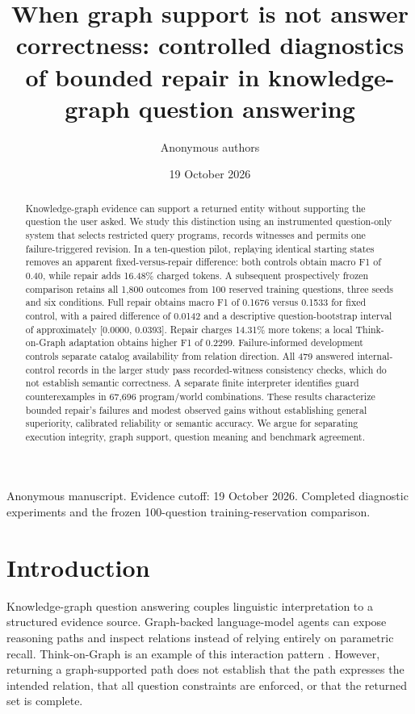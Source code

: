 \documentclass[10pt]{article}
\title{When graph support is not answer correctness: controlled diagnostics of bounded repair in knowledge-graph question answering}
\author{Anonymous authors}
\date{19 October 2026}
\begin{document}
\maketitle

Anonymous manuscript. Evidence cutoff: 19 October 2026. Completed diagnostic experiments and the frozen 100-question training-reservation comparison.\par

\begin{abstract}

Knowledge-graph evidence can support a returned entity without supporting the question the user asked. We study this distinction using an instrumented question-only system that selects restricted query programs, records witnesses and permits one failure-triggered revision. In a ten-question pilot, replaying identical starting states removes an apparent fixed-versus-repair difference: both controls obtain macro F1 of 0.40, while repair adds 16.48\% charged tokens. A subsequent prospectively frozen comparison retains all 1,800 outcomes from 100 reserved training questions, three seeds and six conditions. Full repair obtains macro F1 of 0.1676 versus 0.1533 for fixed control, with a paired difference of 0.0142 and a descriptive question-bootstrap interval of approximately [0.0000, 0.0393]. Repair charges 14.31\% more tokens; a local Think-on-Graph adaptation obtains higher F1 of 0.2299. Failure-informed development controls separate catalog availability from relation direction. All 479 answered internal-control records in the larger study pass recorded-witness consistency checks, which do not establish semantic correctness. A separate finite interpreter identifies guard counterexamples in 67,696 program/world combinations. These results characterize bounded repair's failures and modest observed gains without establishing general superiority, calibrated reliability or semantic accuracy. We argue for separating execution integrity, graph support, question meaning and benchmark agreement.\par

\end{abstract}

\section{Introduction}

Knowledge-graph question answering couples linguistic interpretation to a structured evidence source. Graph-backed language-model agents can expose reasoning paths and inspect relations instead of relying entirely on parametric recall. Think-on-Graph is an example of this interaction pattern \cite{sun2024tog}. However, returning a graph-supported path does not establish that the path expresses the intended relation, that all question constraints are enforced, or that the returned set is complete.\par
\end{document}
